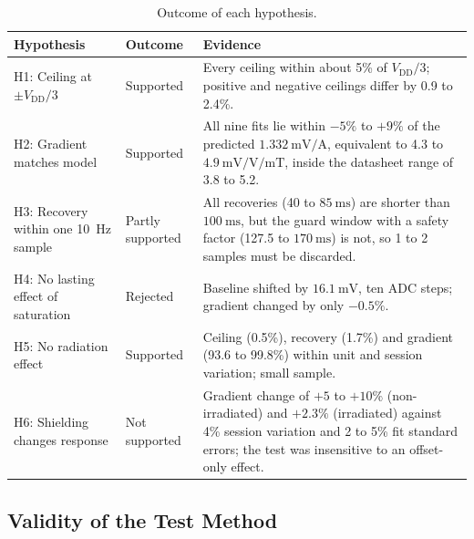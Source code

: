 \documentclass[12pt,a4paper]{article}
\begin{document}
\begin{table}[H]
\centering
\caption{Outcome of each hypothesis.}
\label{tab:hypothesis-outcomes}
\small
\begin{tabular}{@{}>{\raggedright\arraybackslash}p{}>{\raggedright\arraybackslash}p{}>{\raggedright\arraybackslash}p{}@{}}
\toprule
Hypothesis & Outcome & Evidence \\
\midrule
H1: Ceiling at $\pm V_{\text{DD}}/3$ & Supported & Every ceiling within about 5\% of $V_{\text{DD}}/3$; positive and negative ceilings differ by 0.9 to 2.4\%. \\
H2: Gradient matches model & Supported & All nine fits lie within $-5\%$ to $+9\%$ of the predicted $\SI{1.332}{\milli\volt\per\ampere}$, equivalent to 4.3 to $\SI{4.9}{\milli\volt\per\volt\per\milli\tesla}$, inside the datasheet range of 3.8 to 5.2. \\
H3: Recovery within one \SI{10}{\hertz} sample & Partly supported & All recoveries (40 to $\SI{85}{\milli\second}$) are shorter than $\SI{100}{\milli\second}$, but the guard window with a safety factor (127.5 to $\SI{170}{\milli\second}$) is not, so 1 to 2 samples must be discarded. \\
H4: No lasting effect of saturation & Rejected & Baseline shifted by $\SI{16.1}{\milli\volt}$, ten ADC steps; gradient changed by only $-0.5\%$. \\
H5: No radiation effect & Supported & Ceiling (0.5\%), recovery (1.7\%) and gradient (93.6 to 99.8\%) within unit and session variation; small sample. \\
H6: Shielding changes response & Not supported & Gradient change of $+5$ to $+10\%$ (non-irradiated) and $+2.3\%$ (irradiated) against 4\% session variation and 2 to 5\% fit standard errors; the test was insensitive to an offset-only effect. \\
\bottomrule
\end{tabular}
\end{table}

\subsection{Validity of the Test Method}
\label{sec:disc-validity}
\end{document}
